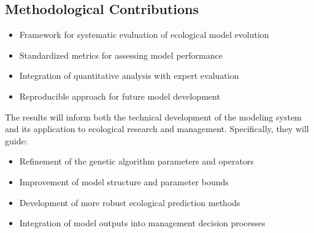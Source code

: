 \subsection{Methodological Contributions}
\begin{itemize}
\item Framework for systematic evaluation of ecological model evolution
\item Standardized metrics for assessing model performance
\item Integration of quantitative analysis with expert evaluation
\item Reproducible approach for future model development
\end{itemize}

The results will inform both the technical development of the modeling system and its application to ecological research and management. Specifically, they will guide:
\begin{itemize}
\item Refinement of the genetic algorithm parameters and operators
\item Improvement of model structure and parameter bounds
\item Development of more robust ecological prediction methods
\item Integration of model outputs into management decision processes
\end{itemize}
